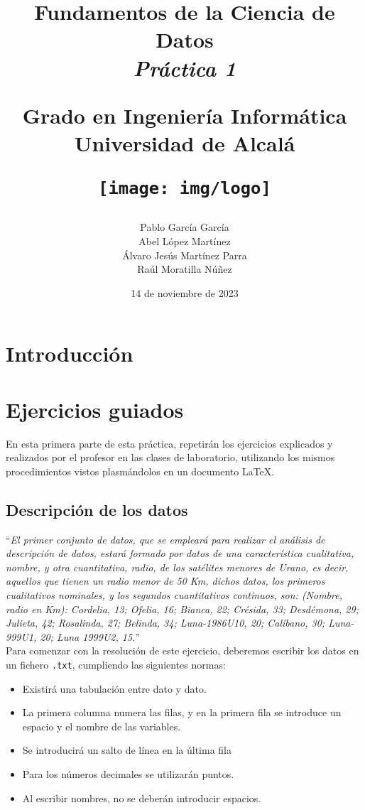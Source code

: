\documentclass[12pt]{report}\usepackage[]{graphicx}\usepackage[dvipsnames]{xcolor}
\title{
	\huge
	\noindent\textbf{Fundamentos de la Ciencia de Datos}\\
	
	{\Large \textit{Práctica 1}}
	\vspace{1cm}
	
	\huge
	Grado en Ingeniería Informática\\
	Universidad de Alcalá\\
	
	\vspace{1cm}
	
	\texttt{[image: img/logo]}
}
\author{
	Pablo García García\\
	Abel López Martínez\\
	Álvaro Jesús Martínez Parra\\
	Raúl Moratilla Núñez
}
\date{
	\large{14 de noviembre de 2023}
}
\begin{document}
	
	\renewcommand{\tablename}{Tabla}
	\renewcommand{\chaptername}{Parte}
	\maketitle \thispagestyle{empty}
	
	\newpage
	
	\tableofcontents
	
	\chapter*{Introducción}
	
	\chapter{Ejercicios guiados}
	
		En esta primera parte de esta práctica, repetirán los ejercicios explicados y realizados por el profesor en las clases de laboratorio, utilizando los mismos procedimientos vistos plasmándolos en un documento \LaTeX{}. 
	
		\section{Descripción de los datos}
		
			``\textit{El primer conjunto de datos, que se empleará para realizar el análisis de descripción de datos, estará formado por datos de una característica cualitativa, nombre, y otra cuantitativa, radio, de los satélites menores de Urano, es decir, aquellos que tienen un radio menor de 50 Km, dichos datos, los primeros cualitativos nominales, y los segundos cuantitativos continuos, son: (Nombre, radio en Km): Cordelia, 13; Ofelia, 16; Bianca, 22; Crésida, 33; Desdémona, 29; Julieta, 42; Rosalinda, 27; Belinda, 34; Luna-1986U10, 20; Calíbano, 30; Luna-999U1, 20; Luna 1999U2, 15.}''\\
			
			Para comenzar con la resolución de este ejercicio, deberemos escribir los datos en un fichero \texttt{.txt}, cumpliendo las siguientes normas: 
			
			\begin{itemize}
				\item Existirá una tabulación entre dato y dato. 
				\item La primera columna numera las filas, y en la primera fila se introduce un espacio y el nombre de las variables. 
				\item Se introducirá un salto de línea en la última fila
				\item Para los números decimales se utilizarán puntos. 
				\item Al escribir nombres, no se deberán introducir espacios. 
			\end{itemize}
			
\end{document}
